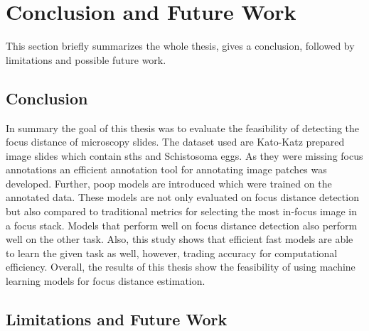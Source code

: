 \chapter{Conclusion and Future Work}
\label{ch:Conclusion}

This section briefly summarizes the whole thesis, gives a conclusion, followed by limitations and possible future work.



\section{Conclusion}
\label{sec:Conclusion:Conclusion}

In summary the goal of this thesis was to evaluate the feasibility of detecting the focus distance of microscopy slides. The dataset used are Kato-Katz prepared image slides which contain \aclp{sth} and Schistosoma eggs. As they were missing focus annotations an efficient annotation tool for annotating image patches was developed. Further, \ac{poop} models are introduced which were trained on the annotated data. These models are not only evaluated on focus distance detection but also compared to traditional metrics for selecting the most in-focus image in a focus stack. Models that perform well on focus distance detection also perform well on the other task. Also, this study shows that efficient fast models are able to learn the given task as well, however, trading accuracy for computational efficiency.
Overall, the results of this thesis show the feasibility of using machine learning models for focus distance estimation.


\section{Limitations and Future Work}
\label{sec:Conclusion:FutureWork}

